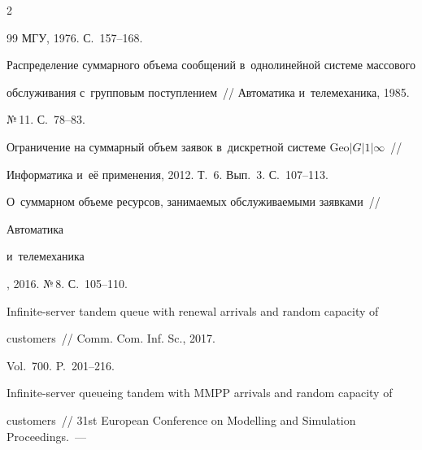 \begin{multicols}{2}
{{\begin{thebibliography}{99}
МГУ, 1976. С.~157--168.











Распределение суммарного объема сообщений в~однолинейной сис\-те\-ме массового 


обслуживания с~групповым поступлением~// {Автоматика и~телемеханика}, 1985. 


№\,11. С.~78--83.











Ограничение на суммарный объем заявок в~дискретной сис\-те\-ме $\mathrm{Geo}|G|1|\infty$~// 


{Информатика и~её применения}, 2012. Т.~6. Вып.~3. С.~107--113.











О~суммарном объеме ресурсов, занимаемых обслуживаемыми заявками~// {Автоматика 


и~телемеханика}, 2016. №\,8. С.~105--110.











Infinite-server tandem queue with renewal arrivals and random capacity of 


customers~// {Comm. Com. Inf. Sc.}, 2017. 


Vol.~700. P.~201--216.











Infinite-server queueing tandem with MMPP arrivals and random capacity of 


customers~// {31st European Conference on Modelling and Simulation Proceedings}.~--- 



\end{thebibliography}}}
\end{multicols}
